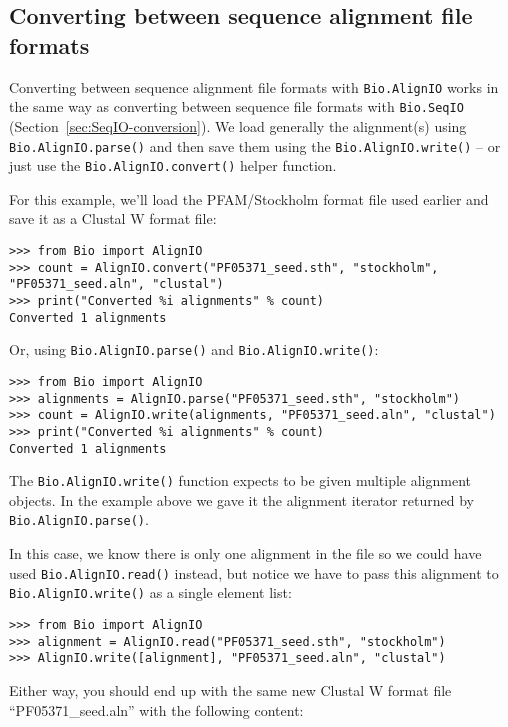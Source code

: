 \subsection{Converting between sequence alignment file formats}
\label{sec:converting-alignments}

Converting between sequence alignment file formats with \verb|Bio.AlignIO| works
in the same way as converting between sequence file formats with \verb|Bio.SeqIO|
(Section~\ref{sec:SeqIO-conversion}). We load generally the alignment(s) using
\verb|Bio.AlignIO.parse()| and then save them using the \verb|Bio.AlignIO.write()|
-- or just use the \verb|Bio.AlignIO.convert()| helper function.

For this example, we'll load the PFAM/Stockholm format file used earlier and save it as a Clustal W format file:

\begin{verbatim}
>>> from Bio import AlignIO
>>> count = AlignIO.convert("PF05371_seed.sth", "stockholm", "PF05371_seed.aln", "clustal")
>>> print("Converted %i alignments" % count)
Converted 1 alignments
\end{verbatim}

Or, using \verb|Bio.AlignIO.parse()| and \verb|Bio.AlignIO.write()|:

\begin{verbatim}
>>> from Bio import AlignIO
>>> alignments = AlignIO.parse("PF05371_seed.sth", "stockholm")
>>> count = AlignIO.write(alignments, "PF05371_seed.aln", "clustal")
>>> print("Converted %i alignments" % count)
Converted 1 alignments
\end{verbatim}

The \verb|Bio.AlignIO.write()| function expects to be given multiple alignment objects.  In the example above we gave it the alignment iterator returned by \verb|Bio.AlignIO.parse()|.

In this case, we know there is only one alignment in the file so we could have used \verb|Bio.AlignIO.read()| instead, but notice we have to pass this alignment to \verb|Bio.AlignIO.write()| as a single element list:

\begin{verbatim}
>>> from Bio import AlignIO
>>> alignment = AlignIO.read("PF05371_seed.sth", "stockholm")
>>> AlignIO.write([alignment], "PF05371_seed.aln", "clustal")
\end{verbatim}

Either way, you should end up with the same new Clustal W format file ``PF05371\_seed.aln'' with the following content:

